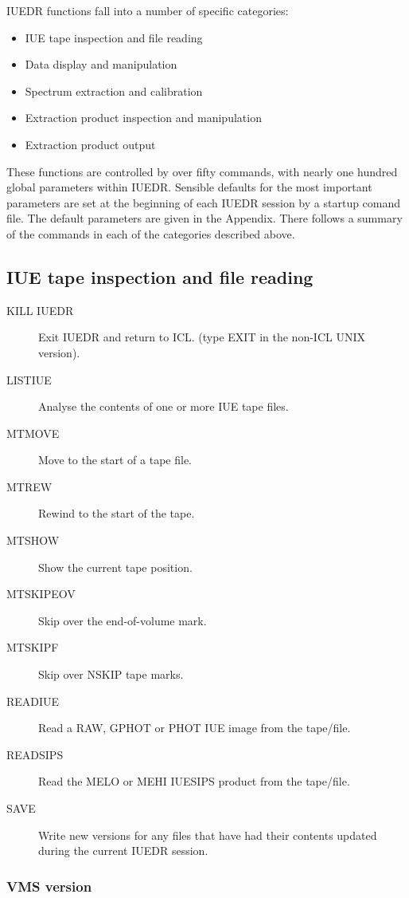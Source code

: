 IUEDR functions fall into a number of specific categories:

\begin {itemize}
\item IUE tape inspection and file reading
\item Data display and manipulation
\item Spectrum extraction and calibration
\item Extraction product inspection and manipulation
\item Extraction product output
\end {itemize}

These functions are controlled by over fifty commands, with  nearly
one hundred global parameters within IUEDR.  Sensible defaults for the
most important parameters are set at the beginning of each IUEDR
session by a startup comand file. The default parameters are given in
the Appendix. There follows a summary of the commands in each of the
categories described above. 

\subsection {IUE tape inspection and file reading}

\begin {description}
\item [KILL IUEDR] Exit IUEDR and return to ICL. (type EXIT in the non-ICL 
UNIX version).
\item [LISTIUE] Analyse the contents of one or more IUE tape files.
\item [MTMOVE] Move to the start of a tape file.
\item [MTREW] Rewind to the start of the tape.
\item [MTSHOW] Show the current tape position.
\item [MTSKIPEOV] Skip over the end-of-volume mark.
\item [MTSKIPF] Skip over NSKIP tape marks.
\item [READIUE] Read a RAW, GPHOT or PHOT IUE image from the tape/file.
\item [READSIPS] Read the MELO or MEHI IUESIPS product from the tape/file.
\item [SAVE] Write new versions for any files that have had their contents 
updated during the current IUEDR session.
\end {description}

\subsubsection{VMS version}

